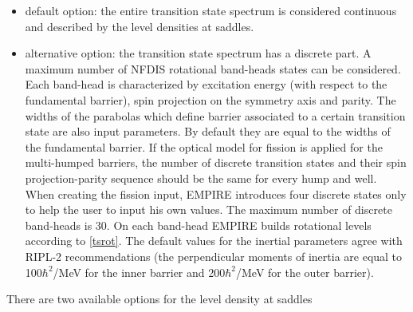 \documentclass[twocolumn,amsmath,amssymb,10pt,groupedaddress,a4paper]{revtex4}
\begin{document}
\begin{itemize}
\item default option: the entire transition state spectrum is
considered continuous and described by the level densities at saddles.
\item alternative option: the transition state spectrum has a discrete part. A maximum
number of NFDIS rotational band-heads states can be considered. Each
band-head is characterized by excitation energy (with respect to the
fundamental barrier), spin projection on the symmetry axis and parity.
The widths of the parabolas which define barrier associated to a certain
transition state are also input parameters. By default they are equal
to the widths of the fundamental barrier. If the optical model for fission is applied
for the multi-humped barriers, the number
of discrete transition states and their spin projection-parity sequence
should be the same for every hump and well. When creating the fission
input, EMPIRE introduces four discrete states only to help the user
to input his own values. The maximum number of discrete band-heads
is 30. On each band-head EMPIRE builds rotational levels according
to \ref{tsrot}. The default values for the inertial parameters agree
with RIPL-2 recommendations (the perpendicular moments of inertia
are equal to 100$\hbar^{2}$/MeV for the inner barrier and 200$\hbar^{2}$/MeV
for the outer barrier).
\end{itemize}
There are two available options for the level density at saddles
\end{document}
